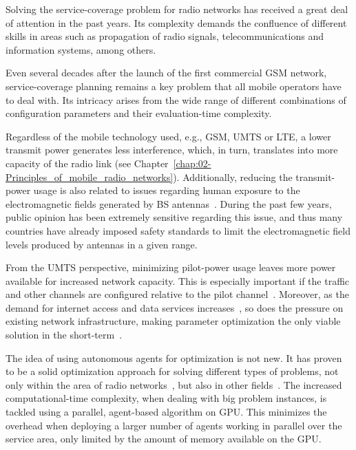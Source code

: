 Solving the service-coverage problem for radio networks has received
a great deal of attention in the past years. Its complexity demands
the confluence of different skills in areas such as propagation of
radio signals, telecommunications and information systems, among others.

Even several decades after the launch of the first commercial GSM
network, service-coverage planning remains a key problem that all
mobile operators have to deal with. Its intricacy arises from the
wide range of different combinations of configuration parameters and
their evaluation-time complexity.

Regardless of the mobile technology used, e.g., GSM, UMTS or LTE,
a lower transmit power generates less interference, which, in turn,
translates into more capacity of the radio link (see Chapter~\ref{chap:02-Principles_of_mobile_radio_networks}).
Additionally, reducing the transmit-power usage is also related to
issues regarding human exposure to the electromagnetic fields generated
by BS antennas~\cite{Esposito_Genetic.optimization.for.optimum.3G.network.planning:2010}.
During the past few years, public opinion has been extremely sensitive
regarding this issue, and thus many countries have already imposed
safety standards to limit the electromagnetic field levels produced
by antennas in a given range.

From the UMTS perspective, minimizing pilot-power usage leaves more
power available for increased network capacity. This is especially
important if the traffic and other channels are configured relative
to the pilot channel~\cite{Holma_WCDMA.for.UMTS:2005}. Moreover,
as the demand for internet access and data services increases~\cite{Cunningham_Network.growth.theory.and.evidence:2010},
so does the pressure on existing network infrastructure, making parameter
optimization the only viable solution in the short-term~\cite{Nawrocki_Understanding:2006}.

\bigskip{}


The idea of using autonomous agents for optimization is not new. It
has proven to be a solid optimization approach for solving different
types of problems, not only within the area of radio networks~\cite{Cheung_Realtime.video.using.agent.over.3G.networks:2005,Esposito_Genetic.optimization.for.optimum.3G.network.planning:2010},
but also in other fields~\cite{Valcarce_Applying.FDTD.to.the.coverage.prediction.of.WiMAX:2009,Vasile_Hybrid.multiagent.approach.for.optimization:2009}.
The increased computational-time complexity, when dealing with big
problem instances, is tackled using a parallel, agent-based algorithm
on GPU. This minimizes the overhead when deploying a larger number
of agents working in parallel over the service area, only limited
by the amount of memory available on the GPU.


